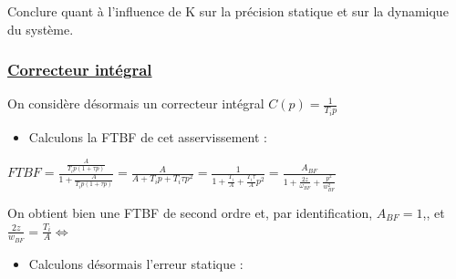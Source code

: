 \documentclass[12pt]{article}
\begin{document}
\normalsize Conclure quant à l’influence de K sur la précision statique et sur la dynamique du système.



\subsubsection{\underline{\bf Correcteur intégral}}

On considère désormais un correcteur intégral $C(p) = \frac{1}{T_ip}$

\begin{itemize}
    \item Calculons la FTBF de cet asservissement : 
\end{itemize}
\begin{center}
    \large $FTBF = \frac{\frac{A}{T_ip(1+\tau p)}}{1 + \frac{A}{T_ip(1+\tau p)}} = \frac{A}{A + T_ip + T_i\tau p^2} = \frac{1}{1 + \frac{T_i}{A} + \frac{T_i \tau}{A}p^2} = \frac{A_{BF}}{1 + \frac{2z}{\omega_{BF}} + \frac{p^2}{w_{BF}^2}}$

\end{center}
\normalsize On obtient bien une FTBF de second ordre et, par identification, $A_{BF} = 1$,, et $\frac{2z}{w_{BF}} = \frac{T_i}{A} \Leftrightarrow $

\begin{itemize}
    \item Calculons désormais l'erreur statique : 
\end{itemize}
\end{document}
